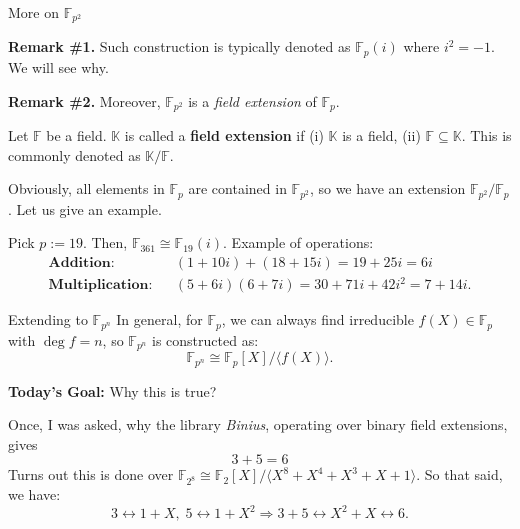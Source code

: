 \documentclass{zkdl-presentation-template}
\begin{document}
    \begin{frame}{More on $\mathbb{F}_{p^2}$} 
        
        \textbf{Remark \#1.} Such construction
        is typically denoted as $\mathbb{F}_p(i)$ where $i^2=-1$. We will see
        why.
        
        \textbf{Remark \#2.} Moreover, $\mathbb{F}_{p^2}$ is a \textit{field
        extension} of $\mathbb{F}_p$.

        \begin{definition}
            Let $\mathbb{F}$ be a field. $\mathbb{K}$ is called a \textbf{field
            extension} if (i) $\mathbb{K}$ is a field, (ii) $\mathbb{F}
            \subseteq \mathbb{K}$. This is commonly denoted as
            $\mathbb{K}/\mathbb{F}$.
        \end{definition}

        Obviously, all elements in $\mathbb{F}_p$ are contained in
        $\mathbb{F}_{p^2}$, so we have an extension
        $\mathbb{F}_{p^2}/\mathbb{F}_p$. Let us give an example.

        \begin{example}
            Pick $p:=19$. Then, $\mathbb{F}_{361} \cong \mathbb{F}_{19}(i)$. Example of operations:
            \begin{align*}
                \textbf{Addition:} && (1+10i) + (18+15i) = 19+25i = 6i \\
                \textbf{Multiplication:} && (5+6i)(6+7i) = 30+71i+42i^2 = 7+14i.
            \end{align*} 
        \end{example}
    \end{frame}

    \begin{frame}{Extending to $\mathbb{F}_{p^n}$} In general, for
        $\mathbb{F}_p$, we can always find irreducible $f(X) \in \mathbb{F}_p$
        with $\deg f = n$, so $\mathbb{F}_{p^n}$ is constructed as:
        \begin{equation*}
            \mathbb{F}_{p^n} \cong \mathbb{F}_p[X] / \langle f(X) \rangle.
        \end{equation*}

        \textbf{Today's Goal:} Why this is true?

        \begin{example}
            Once, I was asked, why the library \textit{Binius}, operating over 
            binary field extensions, gives
            \begin{equation*}
                3 + 5 = 6
            \end{equation*}
            Turns out this is done over $\mathbb{F}_{2^8} \cong
            \mathbb{F}_2[X] / \langle X^8+X^4+X^3+X+1 \rangle$. So that said, we have:
            \begin{equation*}
                3 \leftrightarrow 1+X, \; 5 \leftrightarrow 1+X^2 \Rightarrow 3+5 \leftrightarrow X^2+X \leftrightarrow 6.
            \end{equation*}
        \end{example}
    \end{frame}
\end{document}

